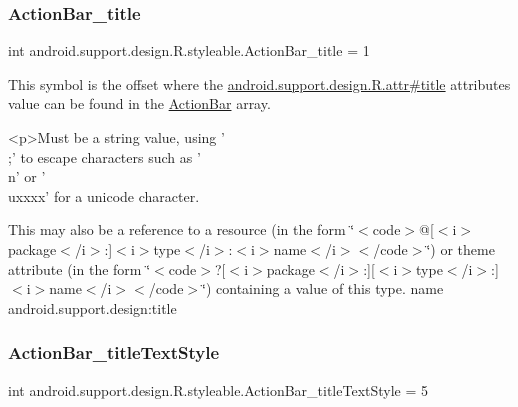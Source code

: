 \subsubsection{\texorpdfstring{Action\+Bar\+\_\+title}{ActionBar\_title}}
{\footnotesize\ttfamily int android.\+support.\+design.\+R.\+styleable.\+Action\+Bar\+\_\+title = 1\hspace{0.3cm}{\ttfamily [static]}}

This symbol is the offset where the \hyperlink{classandroid_1_1support_1_1design_1_1R_1_1attr_a1269cd6a0a69f93e03e342a0bca4f7a2}{android.\+support.\+design.\+R.\+attr\#title} attribute\textquotesingle{}s value can be found in the \hyperlink{classandroid_1_1support_1_1design_1_1R_1_1styleable_ab795220a96557d11f8c21359b95bed82}{Action\+Bar} array.

\begin{DoxyVerb}      <p>Must be a string value, using '\\;' to escape characters such as '\\n' or '\\uxxxx' for a unicode character.
\end{DoxyVerb}
 

This may also be a reference to a resource (in the form \char`\"{}$<$code$>$@\mbox{[}$<$i$>$package$<$/i$>$\+:\mbox{]}$<$i$>$type$<$/i$>$\+:$<$i$>$name$<$/i$>$$<$/code$>$\char`\"{}) or theme attribute (in the form \char`\"{}$<$code$>$?\mbox{[}$<$i$>$package$<$/i$>$\+:\mbox{]}\mbox{[}$<$i$>$type$<$/i$>$\+:\mbox{]}$<$i$>$name$<$/i$>$$<$/code$>$\char`\"{}) containing a value of this type.  name android.\+support.\+design\+:title \mbox{\label{classandroid_1_1support_1_1design_1_1R_1_1styleable_ace9dbdf383d562ec34cff99140bde632}} 
\subsubsection{\texorpdfstring{Action\+Bar\+\_\+title\+Text\+Style}{ActionBar\_titleTextStyle}}
{\footnotesize\ttfamily int android.\+support.\+design.\+R.\+styleable.\+Action\+Bar\+\_\+title\+Text\+Style = 5\hspace{0.3cm}{\ttfamily [static]}}

